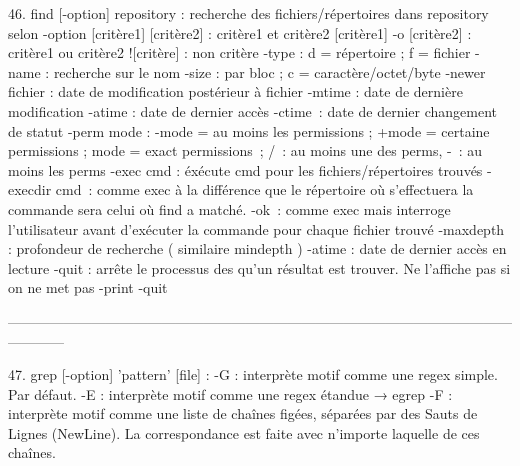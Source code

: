 \documentclass[a4paper, 10pt, onecolumn, openright, oneside]{book}
\begin{document}
    46. find [-option] repository : recherche des fichiers/répertoires dans repository selon -option
[critère1]  [critère2] : critère1 et critère2
[critère1] -o [critère2] : critère1 ou critère2
![critère] : non critère
-type : d = répertoire ; f = fichier
-name : recherche sur le nom
-size : par bloc ; c = caractère/octet/byte
-newer fichier : date de modification postérieur à fichier
-mtime : date de dernière modification
-atime : date de dernier accès
-ctime : date de dernier changement de statut
-perm mode : -mode = au moins les permissions ; +mode = certaine permissions ; 
	mode = exact permissions ; 	/ : au moins une des perms, 	- : au moins les perms
-exec cmd : éxécute cmd pour les fichiers/répertoires trouvés
-execdir cmd : comme exec à la différence que le répertoire où s’effectuera la commande sera celui où find a matché. 
-ok : comme exec mais interroge l'utilisateur avant d’exécuter la commande pour chaque fichier trouvé
-maxdepth : profondeur de recherche ( similaire mindepth )
-atime : date de dernier accès en lecture
-quit : arrête le processus des qu'un résultat est trouver. Ne l'affiche pas si on ne met pas -print -quit 

------------------------------------------------------------------------------------------------------------------------

    47. grep [-option] 'pattern' [file] :
-G : interprète motif comme une regex simple. Par défaut.
-E : interprète motif comme une regex étandue → egrep
-F : interprète motif comme une liste de chaînes figées, séparées par des Sauts de Lignes (NewLine). La correspondance est faite avec n'importe laquelle de ces chaînes.
\end{document}
